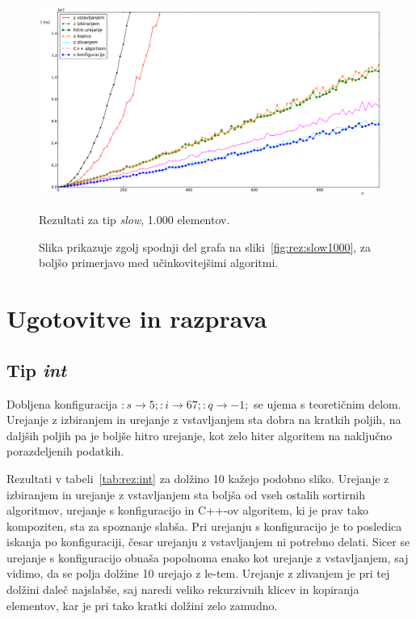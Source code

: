 \documentclass[a4paper,oneside,12pt]{article}
\newcommand{\lra}{\ensuremath{\longrightarrow}}
\begin{document}
\begin{figure}[h!]
    \includegraphics[width=\textwidth]{slike/slow1000zoom.pdf}
    \vspace{-0.7cm}
    \caption[Rezultati za tip \emph{slow}, 1.000 el. -- izrez]{Rezultati za tip
    \emph{slow}, 1.000 elementov.}
    \caption*{{\small Slika
    prikazuje zgolj spodnji del grafa na sliki~\ref{fig:rez:slow1000}, za
    boljšo primerjavo med učinkovitejšimi algoritmi.}}
    \label{fig:rez:slowblizu}
\end{figure}

\pagebreak
\mbox{}

\pagebreak

\section{Ugotovitve in razprava}
\subsection{Tip \emph{int}}
Dobljena konfiguracija $:s \lra 5;:i \lra 67;:q \lra -1;$
se ujema s teoretičnim delom. Urejanje z izbiranjem in urejanje z vstavljanjem sta 
dobra na kratkih poljih, na daljših poljih pa je boljše hitro urejanje, kot zelo hiter algoritem na naključno
porazdeljenih podatkih. 

Rezultati v tabeli~\ref{tab:rez:int} za dolžino 10 kažejo podobno sliko. Urejanje z izbiranjem in urejanje 
z vstavljanjem sta boljša od vseh ostalih sortirnih algoritmov, urejanje s konfiguracijo in \mbox{C++-ov} 
algoritem, ki je prav tako kompoziten, sta za spoznanje slabša. Pri urejanju s konfiguracijo je to posledica
iskanja po konfiguraciji, česar urejanju z vstavljanjem ni potrebno delati. Sicer 
se urejanje s konfiguracijo obnaša popolnoma enako kot urejanje z vstavljanjem, saj vidimo, da se polja dolžine 
10 urejajo z le-tem. Urejanje z zlivanjem je pri tej dolžini daleč najslabše, saj naredi veliko 
rekurzivnih klicev in kopiranja elementov, kar je pri tako kratki dolžini zelo zamudno.
\end{document}
